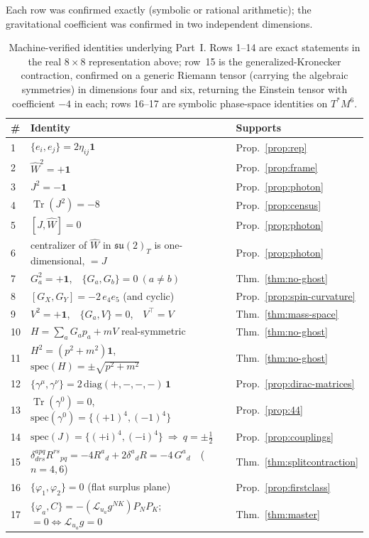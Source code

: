 \documentclass[11pt,oneside]{book}
\newcommand{\Wh}{\hat{W}}                         %
\newcommand{\Tr}{\operatorname{Tr}}
\newcommand{\su}{\mathfrak{su}}
\newcommand{\Lie}{\mathcal{L}}
\theoremstyle{plain}
\theoremstyle{definition}
\theoremstyle{remark}
\begin{document}
Each row was confirmed exactly (symbolic or rational arithmetic); the gravitational
coefficient was confirmed in two independent dimensions.

\begin{table}[h]
\centering
\small
\begin{tabular}{lll}
\toprule
\# & Identity & Supports\\
\midrule
1  & $\{e_i,e_j\}=2\eta_{ij}\mathbf 1$ & Prop.~\ref{prop:rep}\\
2  & $\Wh^2=+\mathbf 1$ & Prop.~\ref{prop:frame}\\
3  & $J^2=-\mathbf 1$ & Prop.~\ref{prop:photon}\\
4  & $\Tr(J^2)=-8$ & Prop.~\ref{prop:census}\\
5  & $[J,\Wh]=0$ & Prop.~\ref{prop:photon}\\
6  & centralizer of $\Wh$ in $\su(2)_T$ is one-dimensional, $=J$ & Prop.~\ref{prop:photon}\\
7  & $G_a^2=+\mathbf 1$,\ \ $\{G_a,G_b\}=0\ (a\neq b)$ & Thm.~\ref{thm:no-ghost}\\
8  & $[G_X,G_Y]=-2\,e_4e_5$ (and cyclic) & Prop.~\ref{prop:spin-curvature}\\
9  & $V^2=+\mathbf 1$,\ \ $\{G_a,V\}=0$,\ \ $V^\top=V$ & Thm.~\ref{thm:mass-space}\\
10 & $H=\sum_a G_a p_a+mV$ real-symmetric & Thm.~\ref{thm:no-ghost}\\
11 & $H^2=(p^2+m^2)\mathbf 1$,\ \ $\mathrm{spec}(H)=\pm\sqrt{p^2+m^2}$ & Thm.~\ref{thm:no-ghost}\\
12 & $\{\gamma^\mu,\gamma^\nu\}=2\,\mathrm{diag}(+,-,-,-)\,\mathbf 1$ & Prop.~\ref{prop:dirac-matrices}\\
13 & $\Tr(\gamma^0)=0$,\ \ $\mathrm{spec}(\gamma^0)=\{(+1)^4,(-1)^4\}$ & Prop.~\ref{prop:44}\\
14 & $\mathrm{spec}(J)=\{(+\mathrm i)^4,(-\mathrm i)^4\}\ \Rightarrow\ q=\pm\tfrac12$ & Prop.~\ref{prop:couplings}\\
15 & $\delta^{apq}_{drs}R^{rs}{}_{pq}=-4R^a{}_d+2\delta^a{}_dR=-4\,G^a{}_d$\ \ ($n=4,6$) & Thm.~\ref{thm:splitcontraction}\\
16 & $\{\varphi_1,\varphi_2\}=0$ (flat surplus plane) & Prop.~\ref{prop:firstclass}\\
17 & $\{\varphi_a,C\}=-(\Lie_{u_a}g^{NK})P_NP_K$;\ \ $=0\iff\Lie_{u_a}g=0$ & Thm.~\ref{thm:master}\\
\bottomrule
\end{tabular}
\caption{Machine-verified identities underlying Part~I. Rows 1--14 are exact
statements in the real $8\times8$ representation above; row~15 is the
generalized-Kronecker contraction, confirmed on a generic Riemann tensor (carrying the
algebraic symmetries) in dimensions four and six, returning the Einstein tensor with
coefficient $-4$ in each; rows 16--17 are symbolic phase-space identities on
$T^*M^6$.}
\label{tab:verified}
\end{table}
\end{document}
